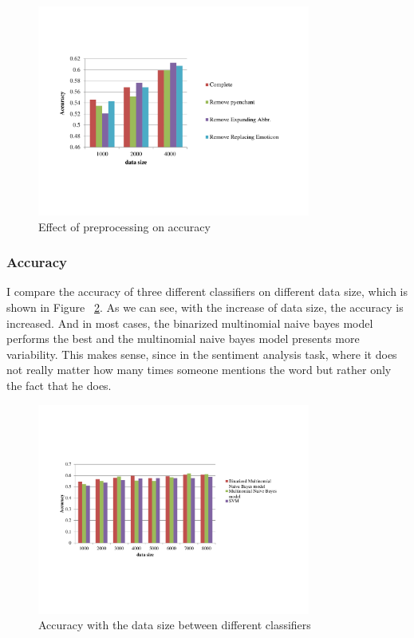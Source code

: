 \documentclass{article}
\begin{document}
\begin{figure}[h!]
\centering
\includegraphics[width=0.8\textwidth]{pics/ParameterSentivity.pdf}
\caption{Effect of preprocessing on accuracy}
\label{Fig:preprocessing}
\end{figure}
\subsubsection{Accuracy}
I compare the accuracy of three different classifiers on different data size, which is shown in Figure ~\ref{Fig:accuracy}.  As we can see, with the increase of data size, the accuracy is increased. And in most cases, the binarized multinomial naive bayes model performs the best and the multinomial naive bayes model presents more variability. This makes sense, since in the sentiment analysis task, where it does not really matter how many times someone mentions the word but rather only the fact that he does. 

\begin{figure}
\centering
\includegraphics[width=0.8\textwidth]{pics/Accuracy.pdf}
\caption{Accuracy with the data size between different classifiers}
\label{Fig:accuracy}
\end{figure}
\end{document}
